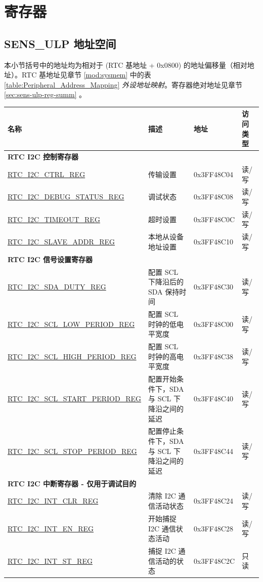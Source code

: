 \documentclass[main\_\_CN.tex]{subfiles}
\begin{document}
\clearpage
\section{寄存器}

\subsection{SENS\_ULP 地址空间}
本小节括号中的地址均为相对于 (RTC 基地址 + 0x0800) 的地址偏移量（相对地址）。RTC 基地址见章节 \ref{mod:sysmem} \textit{} 中的表 \ref{table:Peripheral_Address_Mapping} \textit{外设地址映射}。寄存器绝对地址见章节 \ref{sec:sens-ulp-reg-summ} \textit{}。


\begin{longtable}{ | m{6cm} | m{5.5cm} | m{2cm} | m{1.5cm} | }
\hline\rowcolor{lightgray}
名称 & 描述 &  地址 & 访问类型 \\ \hline
\multicolumn{4}{|l|}{\textbf{RTC I2C 控制寄存器}} \\ \hline
\hyperref[regdesc:RTCI2CCTRLREG]{RTC\_I2C\_CTRL\_REG} & 传输设置 & 0x3FF48C04 & 读/写 \\ \hline
\hyperref[regdesc:RTCI2CDEBUGSTATUSREG]{RTC\_I2C\_DEBUG\_STATUS\_REG} & 调试状态 & 0x3FF48C08 & 读/写 \\ \hline
\hyperref[regdesc:RTCI2CTIMEOUTREG]{RTC\_I2C\_TIMEOUT\_REG} & 超时设置 & 0x3FF48C0C & 读/写 \\ \hline
\hyperref[regdesc:RTCI2CSLAVEADDRREG]{RTC\_I2C\_SLAVE\_ADDR\_REG} & 本地从设备地址设置 & 0x3FF48C10 & 读/写 \\ \hline
\multicolumn{4}{|l|}{\textbf{RTC I2C 信号设置寄存器}} \\ \hline
\hyperref[regdesc:RTCI2CSDADUTYREG]{RTC\_I2C\_SDA\_DUTY\_REG} & 配置 SCL 下降沿后的 SDA 保持时间 & 0x3FF48C30 & 读/写 \\ \hline
\hyperref[regdesc:RTCI2CSCLLOWPERIODREG]{RTC\_I2C\_SCL\_LOW\_PERIOD\_REG} & 配置 SCL 时钟的低电平宽度 & 0x3FF48C00 & 读/写 \\ \hline
\hyperref[regdesc:RTCI2CSCLLOWPERIODREG]{RTC\_I2C\_SCL\_HIGH\_PERIOD\_REG} & 配置 SCL 时钟的高电平宽度 & 0x3FF48C38 & 读/写 \\ \hline
\hyperref[regdesc:RTCI2CSCLSTARTPERIODREG]{RTC\_I2C\_SCL\_START\_PERIOD\_REG} & 配置开始条件下，SDA 与 SCL 下降沿之间的延迟 & 0x3FF48C40 & 读/写 \\ \hline

\hyperref[regdesc:RTCI2CSCLSTOPPERIODREG]{RTC\_I2C\_SCL\_STOP\_PERIOD\_REG} & 配置停止条件下，SDA 与 SCL 下降沿之间的延迟 & 0x3FF48C44 & 读/写 \\ \hline
\multicolumn{4}{|l|}{\textbf{RTC I2C 中断寄存器 - 仅用于调试目的}} \\ \hline
\hyperref[regdesc:RTCI2CINTCLRREG]{RTC\_I2C\_INT\_CLR\_REG} & 清除 I2C 通信活动状态 & 0x3FF48C24 & 读/写 \\ \hline
\hyperref[regdesc:RTCI2CINTENREG]{RTC\_I2C\_INT\_EN\_REG} & 开始捕捉 I2C 通信状态活动 & 0x3FF48C28 & 读/写 \\ \hline
\hyperref[regdesc:RTCI2CINTSTREG]{RTC\_I2C\_INT\_ST\_REG} & 捕捉 I2C 通信活动的状态 & 0x3FF48C2C & 只读 \\ \hline
\end{longtable}
\end{document}
